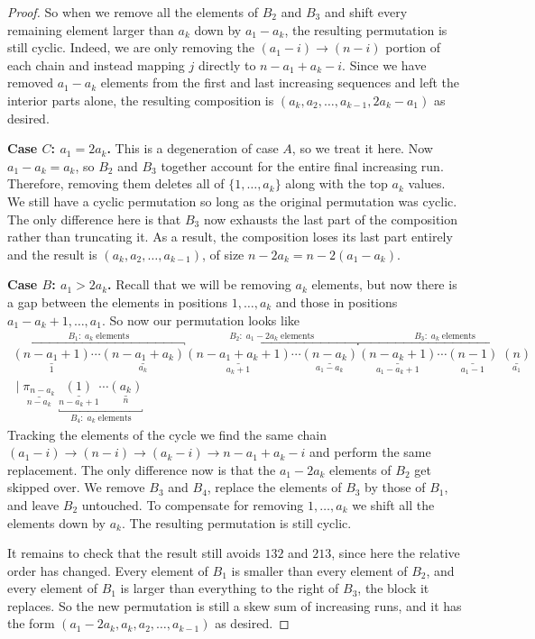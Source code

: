 \documentclass[11pt]{article}
\theoremstyle{definition}
\begin{document}
\begin{proof}
    So when we remove all the elements of $B_2$ and $B_3$ and shift every remaining element larger than $a_k$ down by $a_1-a_k$, the resulting permutation is still cyclic. Indeed, we are only removing the $(a_1 - i) \to (n-i)$ portion of each chain and instead mapping $j$ directly to $n-a_1 + a_k - i$. Since we have removed $a_1-a_k$ elements from the first and last increasing sequences and left the interior parts alone, the resulting composition is $(a_k,a_2,\dots,a_{k-1},2a_k-a_1)$ as desired.

    \medskip
    \noindent\textbf{Case $C$: $a_1 = 2a_k$.} This is a degeneration of case $A$, so we treat it here. Now $a_1 - a_k = a_k$, so $B_2$ and $B_3$ together account for the entire final increasing run. Therefore, removing them deletes all of $\{1,\dots,a_k\}$ along with the top $a_k$ values. We still have a cyclic permutation so long as the original permutation was cyclic. The only difference here is that $B_3$ now exhausts the last part of the composition rather than truncating it. As a result, the composition loses its last part entirely and the result is $(a_k, a_2,\dots,a_{k-1})$, of size $n - 2a_k = n - 2(a_1-a_k)$.

    \medskip
    \noindent\textbf{Case $B$: $a_1 > 2a_k$.} Recall that we will be removing $a_k$ elements, but now there is a gap between the elements in positions $1,\dots,a_k$ and those in positions $a_1 - a_k + 1,\dots,a_1$. So now our permutation looks like
    \[
     \begin{gathered}
    \overbracket{\underset{1}{\underline{(n-a_1+1)}} \cdots \underset{a_k}{\underline{(n-a_1 + a_k)}}}^{B_1: \; a_k \; \text{elements}}  \overbracket{ \underset{a_k+1}{\underline{(n-a_1+a_k+1)}} \cdots\underset{a_1-a_k}{\underline{(n-a_k)}}}^{B_2: \; a_1-2a_k \; \text{elements}} \overbracket{\underset{a_1-a_k +1}{\underline{(n-a_k+1)}}\cdots \underset{a_1-1}{\underline{(n-1)}} \;\underset{a_1}{\underline{(n)}}}^{B_3: \; a_k \; \text{elements}} \\ 
     \; | \;\underset{n-a_k}{\underline{\pi_{n-a_k}}} \;\underbracket{\underset{n-a_k+1}{\underline{(1)}} \cdots \underset{n}{\underline{(a_k)}}}_{B_4: \; a_k \; \text{elements}}
    \end{gathered}
    \]
    Tracking the elements of the cycle we find the same chain $(a_1-i) \to (n-i) \to (a_k-i) \to n-a_1 + a_k - i$ and perform the same replacement. The only difference now is that the $a_1-2a_k$ elements of $B_2$ get skipped over. We remove $B_3$ and $B_4$, replace the elements of $B_3$ by those of $B_1$, and leave $B_2$ untouched. To compensate for removing $1,\dots,a_k$ we shift all the elements down by $a_k$. The resulting permutation is still cyclic.

    It remains to check that the result still avoids $132$ and $213$, since here the relative order has changed. Every element of $B_1$ is smaller than every element of $B_2$, and every element of $B_1$ is larger than everything to the right of $B_3$, the block it replaces. So the new permutation is still a skew sum of increasing runs, and it has the form $(a_1-2a_k,a_k,a_2,\dots,a_{k-1})$ as desired.
\end{proof}
\end{document}
